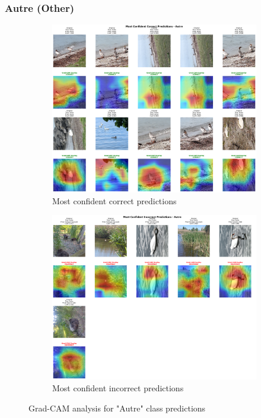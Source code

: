 \documentclass[12pt,a4paper]{article}
\begin{document}
\subsubsection{Autre (Other)}

\begin{figure}[H]
    \centering
    \begin{subfigure}[b]{0.45\textwidth}
        \centering
        \includegraphics[width=\textwidth]{../../output/gradcam_best_model_analysis_20250615_172003/class_analysis/Autre_correct.png}
        \caption{Most confident correct predictions}
        \label{fig:autre_correct}
    \end{subfigure}
    \hfill
    \begin{subfigure}[b]{0.45\textwidth}
        \centering
        \includegraphics[width=\textwidth]{../../output/gradcam_best_model_analysis_20250615_172003/class_analysis/Autre_incorrect.png}
        \caption{Most confident incorrect predictions}
        \label{fig:autre_incorrect}
    \end{subfigure}
    \caption{Grad-CAM analysis for "Autre" class predictions}
    \label{fig:autre_gradcam}
\end{figure}
\end{document}
